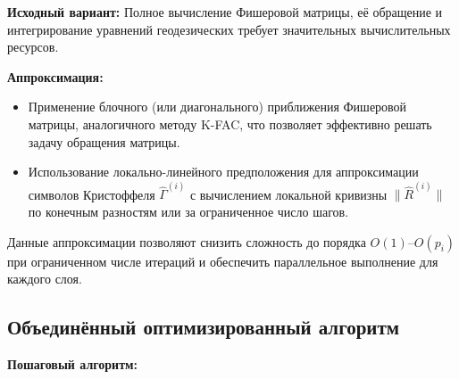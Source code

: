 \documentclass[a4paper,12pt]{article}
\begin{document}
\textbf{Исходный вариант:} Полное вычисление Фишеровой матрицы, её обращение и интегрирование уравнений геодезических требует значительных вычислительных ресурсов.

\textbf{Аппроксимация:}
\begin{itemize}
    \item Применение блочного (или диагонального) приближения Фишеровой матрицы, аналогичного методу K-FAC, что позволяет эффективно решать задачу обращения матрицы.
    \item Использование локально-линейного предположения для аппроксимации символов Кристоффеля \(\hat{\Gamma}^{(i)}\) с вычислением локальной кривизны \(\| \hat{R}^{(i)} \|\) по конечным разностям или за ограниченное число шагов.
\end{itemize}
Данные аппроксимации позволяют снизить сложность до порядка \( O(1) \)–\( O(p_i) \) при ограниченном числе итераций и обеспечить параллельное выполнение для каждого слоя.

\subsection*{Объединённый оптимизированный алгоритм}

\textbf{Пошаговый алгоритм:}
\end{document}
